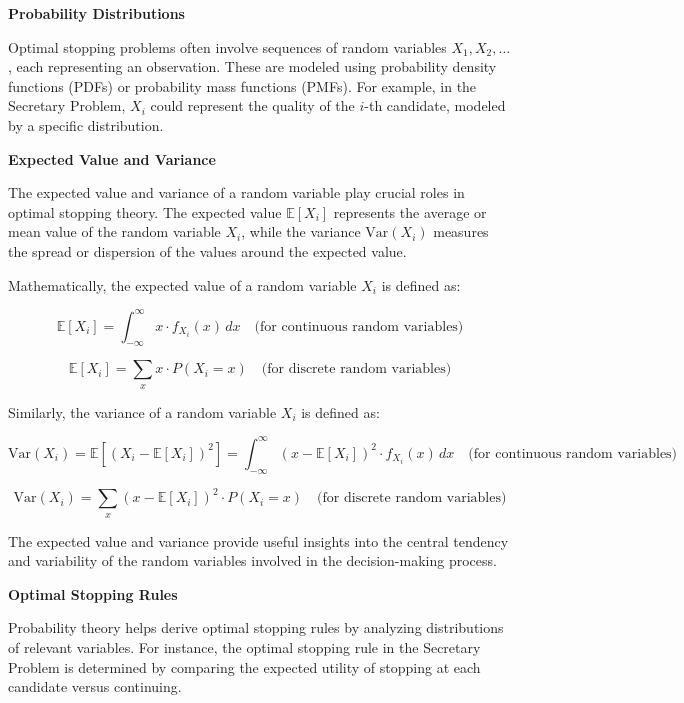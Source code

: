 \documentclass[12pt]{book} %
\begin{document}
\textbf{Probability Distributions}

Optimal stopping problems often involve sequences of random variables \(X_1, X_2, \ldots\), each representing an observation. These are modeled using probability density functions (PDFs) or probability mass functions (PMFs). For example, in the Secretary Problem, \(X_i\) could represent the quality of the $i$-th candidate, modeled by a specific distribution.


\textbf{Expected Value and Variance}

The expected value and variance of a random variable play crucial roles in optimal stopping theory. The expected value $\mathbb{E}[X_i]$ represents the average or mean value of the random variable $X_i$, while the variance $\text{Var}(X_i)$ measures the spread or dispersion of the values around the expected value.

Mathematically, the expected value of a random variable $X_i$ is defined as:

\begin{equation*}
    \mathbb{E}[X_i] = \int_{-\infty}^{\infty} x \cdot f_{X_i}(x) \, dx \quad \text{(for continuous random variables)}
\end{equation*}

\begin{equation*}
    \mathbb{E}[X_i] = \sum_{x} x \cdot P(X_i = x) \quad \text{(for discrete random variables)}
\end{equation*}

Similarly, the variance of a random variable $X_i$ is defined as:

\begin{equation*}
    \text{Var}(X_i) = \mathbb{E}[(X_i - \mathbb{E}[X_i])^2] = \int_{-\infty}^{\infty} (x - \mathbb{E}[X_i])^2 \cdot f_{X_i}(x) \, dx \quad \text{(for continuous random variables)}
\end{equation*}

\begin{equation*}
    \text{Var}(X_i) = \sum_{x} (x - \mathbb{E}[X_i])^2 \cdot P(X_i = x) \quad \text{(for discrete random variables)}
\end{equation*}

The expected value and variance provide useful insights into the central tendency and variability of the random variables involved in the decision-making process.

\textbf{Optimal Stopping Rules}

Probability theory helps derive optimal stopping rules by analyzing distributions of relevant variables. For instance, the optimal stopping rule in the Secretary Problem is determined by comparing the expected utility of stopping at each candidate versus continuing.
\end{document}
